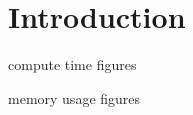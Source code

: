 

\section{Introduction}

\begin{frame}
		compute time figures
\end{frame}

\begin{frame}
		memory usage figures
\end{frame}
